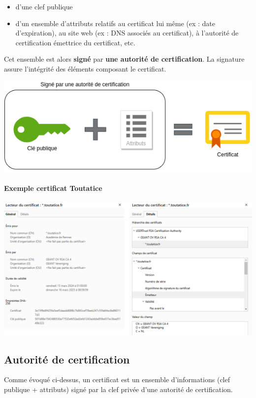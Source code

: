 \documentclass[french, 12pt]{article}%
\newcommand{\itemE}{\item[$\bullet$]}
\begin{document}
\begin{itemize}
\itemE d'une clef publique
\itemE d'un ensemble d'attributs relatifs au certificat lui même (ex : date d'expiration), au site web (ex : DNS associés au certificat), à l'autorité de certification émettrice du certificat, etc.
\end{itemize}

Cet ensemble est alors \textbf{signé} par \textbf{une autorité de certification}. La signature assure l’intégrité des éléments composant le certificat.

\begin{center}
\includegraphics[scale=0.7]{./ressource/certifcatDessin}
\end{center}

\paragraph{Exemple certificat Toutatice}
\begin{center}
\includegraphics[scale=0.5]{./ressource/certifcatToutatice.png}
\end{center}

\subsection{Autorité de certification}
Comme évoqué ci-dessus, un certificat est un ensemble d’informations (clef publique + attributs) signé par la clef privée d’une autorité de certification.
\end{document}
